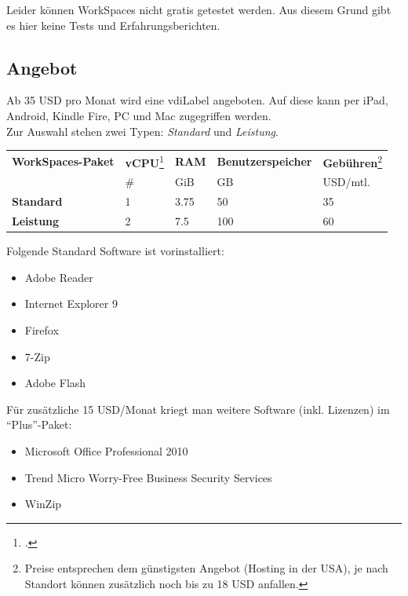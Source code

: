 Leider können WorkSpaces nicht gratis getestet werden. Aus diesem Grund gibt es hier keine Tests und Erfahrungsberichten.

\subsection{Angebot}
Ab 35 USD pro Monat wird eine \Gls{vdiLabel} angeboten. Auf diese kann per iPad, Android, Kindle Fire, PC und Mac zugegriffen werden.\\
Zur Auswahl stehen zwei Typen: \textit{Standard} und \textit{Leistung}.

\begin{table}[H]
	\centering
	\small\renewcommand{\arraystretch}{1.4}  
	\begin{tabularx}{0.9\textwidth}{X | Y | Y | Y | Y }
		\hline
		\textbf{WorkSpaces-Paket} & \textbf{vCPU}\footcite{Virtual_CPUs_with_Amazon_Web_Services_2014-11-15} & \textbf{RAM} & \textbf{Benutzerspeicher} & \textbf{Gebühren}\footnote{Preise entsprechen dem günstigsten Angebot (Hosting in der USA), je nach Standort können zusätzlich noch bis zu 18 USD anfallen.}\\
		 & \# & GiB & GB & USD/mtl.\\
		\hline
			\textbf{Standard} & 1 & 3.75 & 50 & 35\\
			\textbf{Leistung} & 2 & 7.5 & 100 & 60\\
		\hline
	\end{tabularx}
\end{table}

Folgende Standard Software ist vorinstalliert:
\begin{itemize}
	\item Adobe Reader
	\item Internet Explorer 9
	\item Firefox
	\item 7-Zip
	\item Adobe Flash
\end{itemize}

Für zusätzliche 15 USD/Monat kriegt man weitere Software (inkl. Lizenzen) im "`Plus"'-Paket:
\begin{itemize}
	\item Microsoft Office Professional 2010
	\item Trend Micro Worry-Free Business Security Services
	\item WinZip
\end{itemize}

